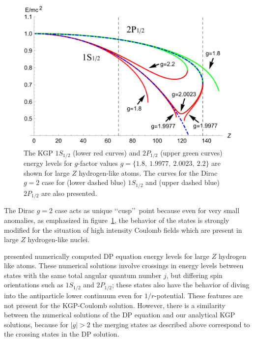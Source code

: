 \begin{figure}[h]
    \centering
    \includegraphics[width=\linewidth]{plots/chap02moment/lanplot08.pdf}
     \caption{The KGP $1S_{1/2}$ (lower red curves) and $2P_{1/2}$ (upper green curves) energy levels for $g$-factor values $g\!=\!\{1.8,\ 1.9977,\ 2.0023,\ 2.2\}$ are shown for large $Z$ hydrogen-like atoms. The curves for the Dirac $g\!=\!2$ case for (lower dashed blue) $1S_{1/2}$ and (upper dashed blue) $2P_{1/2}$ are also presented.}
    \label{f03}
\end{figure}

The Dirac $g\!=\!2$ case acts as unique \lq\lq cusp\rq\rq\ point because even for very small anomalies, as emphasized in figure~\ref{f03}, the behavior of the states is strongly modified for the situation of high intensity Coulomb fields which are present in large $Z$ hydrogen-like nuclei.

\cite{Thaller:1992ji} presented numerically computed DP equation energy levels for large $Z$ hydrogen like atoms. These numerical solutions involve crossings in energy levels between states with the same total angular quantum number $j$, but differing spin orientations such as $1S_{1/2}$ and $2P_{1/2}$; these states also have the behavior of diving into the antiparticle lower continuum even for $1/r$-potential. These features are not present for the KGP-Coulomb solution. However, there is a similarity between the numerical solutions of the DP equation and our analytical KGP solutions, because for $|g|>2$ the merging states as described above correspond to the crossing states in the DP solution.

